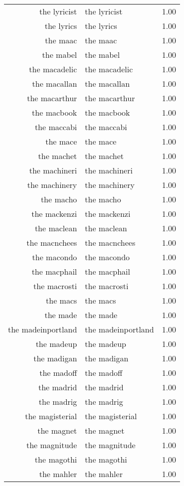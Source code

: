 \begin{table}[ht]
\begin{tabular}{rlr}
  the lyricist & the lyricist & 1.00 \\ 
  the lyrics & the lyrics & 1.00 \\ 
  the maac & the maac & 1.00 \\ 
  the mabel & the mabel & 1.00 \\ 
  the macadelic & the macadelic & 1.00 \\ 
  the macallan & the macallan & 1.00 \\ 
  the macarthur & the macarthur & 1.00 \\ 
  the macbook & the macbook & 1.00 \\ 
  the maccabi & the maccabi & 1.00 \\ 
  the mace & the mace & 1.00 \\ 
  the machet & the machet & 1.00 \\ 
  the machineri & the machineri & 1.00 \\ 
  the machinery & the machinery & 1.00 \\ 
  the macho & the macho & 1.00 \\ 
  the mackenzi & the mackenzi & 1.00 \\ 
  the maclean & the maclean & 1.00 \\ 
  the macnchees & the macnchees & 1.00 \\ 
  the macondo & the macondo & 1.00 \\ 
  the macphail & the macphail & 1.00 \\ 
  the macrosti & the macrosti & 1.00 \\ 
  the macs & the macs & 1.00 \\ 
  the made & the made & 1.00 \\ 
  the madeinportland & the madeinportland & 1.00 \\ 
  the madeup & the madeup & 1.00 \\ 
  the madigan & the madigan & 1.00 \\ 
  the madoff & the madoff & 1.00 \\ 
  the madrid & the madrid & 1.00 \\ 
  the madrig & the madrig & 1.00 \\ 
  the magisterial & the magisterial & 1.00 \\ 
  the magnet & the magnet & 1.00 \\ 
  the magnitude & the magnitude & 1.00 \\ 
  the magothi & the magothi & 1.00 \\ 
  the mahler & the mahler & 1.00 \\ 

\end{tabular}
\end{table}
